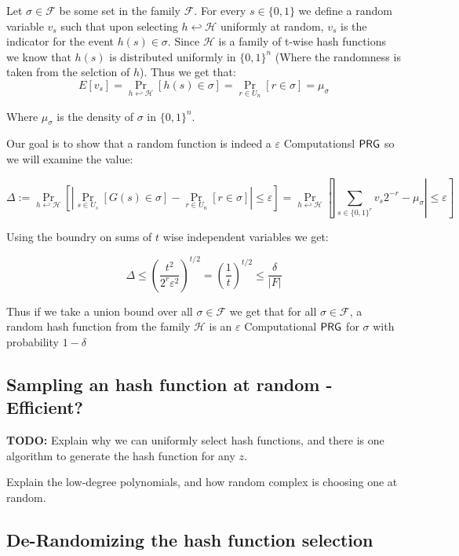 \documentclass[11]{article}
\newenvironment{proof}[1][Proof]{\begin{trivlist}
\item[\hskip \labelsep {\bfseries #1}]}{\end{trivlist}}
\begin{document}
\begin{proof}

Let $\sigma \in \mathcal{F}$ be some set in the family $\mathcal{F}$. For every $s \in \{0,1\}$ we define a random variable $v_s$ such that upon selecting $h \hookleftarrow \mathcal{H}$ uniformly at random, $v_s$ is the indicator for the event $h(s) \in \sigma$. Since $\mathcal{H}$ is a family of t-wise hash functions we know that $h(s)$ is distributed uniformly in $\{0,1\}^n$ (Where the randomness is taken from the selction of $h$). Thus we get that:
$$ E[v_s] = \Pr_{h \hookleftarrow \mathcal{H}}[h(s) \in \sigma] = \Pr_{r \in U_n}[r \in \sigma] = \mu_{\sigma}$$

Where $\mu_{\sigma}$ is the density of $\sigma$ in $\{0,1\}^n.$

Our goal is to show that a random function is indeed a $\varepsilon$ Computationsl $\mathsf{PRG}$ so we will examine the value:

$$ \Delta := \Pr_{h \hookleftarrow \mathcal{H}}[ | \Pr_{s \in U_s}[G(s) \in \sigma] - \Pr_{r \in U_n}[r \in \sigma] | \leq \varepsilon ] = \Pr_{h \hookleftarrow \mathcal{H}}[ | \sum_{s \in \{0,1\}^r} v_s 2^{-r}- \mu_{\sigma} | \leq \varepsilon] $$

Using the boundry on sums of $t$ wise independent variables we get:

$$ \Delta  \leq \left( \frac{t^2}{2^{r} \varepsilon^2} \right) ^{t/2} = \left(\frac{1}{t} \right)^{t/2} \leq \frac{\delta}{|F|}$$

Thus if we take a union bound over all $\sigma \in \mathcal{F}$ we get that for all $\sigma \in \mathcal{F}$, a random hash function from the family $\mathcal{H}$ is an $\varepsilon$ Computational $\mathsf{PRG}$ for $\sigma$ with probability $1-\delta$

\end{proof}

\subsection{Sampling an hash function at random - Efficient?}

\textbf{TODO:}
Explain why we can uniformly select hash functions, and there is one algorithm to generate the hash function for any $z$.

Explain the low-degree polynomials, and how random complex is choosing one at random.

\subsection{De-Randomizing the hash function selection}
\end{document}
